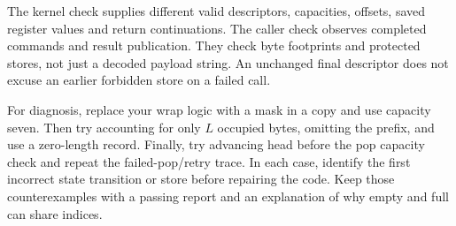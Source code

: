 The kernel check supplies different valid descriptors, capacities, offsets, saved
register values and return continuations. The caller check observes completed
commands and result publication. They check byte footprints and protected stores,
not just a decoded payload string. An unchanged final descriptor does not excuse
an earlier forbidden store on a failed call.

For diagnosis, replace your wrap logic with a mask in a copy and use capacity seven.
Then try accounting for only $L$ occupied bytes, omitting the prefix, and use a
zero-length record. Finally, try advancing head before the pop capacity check and
repeat the failed-pop/retry trace. In each case, identify the first incorrect
state transition or store before repairing the code. Keep those counterexamples
with a passing report and an explanation of why empty and full can share indices.
